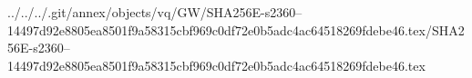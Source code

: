 ../../../.git/annex/objects/vq/GW/SHA256E-s2360--14497d92e8805ea8501f9a58315cbf969c0df72e0b5adc4ac64518269fdebe46.tex/SHA256E-s2360--14497d92e8805ea8501f9a58315cbf969c0df72e0b5adc4ac64518269fdebe46.tex